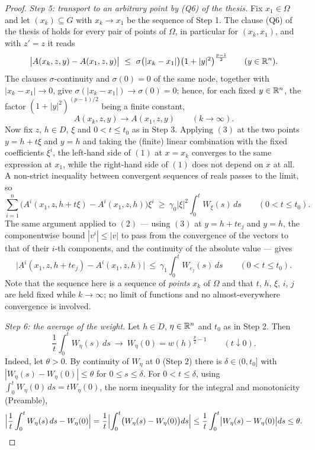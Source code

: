\begin{proof}
\emph{Step 5: transport to an arbitrary point by (Q6) of the thesis.}  Fix
$x_1\in\Omega$ and let $(x_k)\subseteq G$ with $x_k\to x_1$ be the sequence of
Step 1.  The clause (Q6) of the thesis of  holds for
every pair of points of $\Omega$, in particular for $(x_k,x_1)$, and with
$z'=z$ it reads
\[
\bigl|A(x_k,z,y)-A(x_1,z,y)\bigr|
\ \le\ \sigma\bigl(|x_k-x_1|\bigr)\bigl(1+|y|^2\bigr)^{\frac{p-1}2}
\qquad(y\in\mathbb{R}^n).
\]
The clauses $\sigma$-continuity and $\sigma(0)=0$ of the same node, together
with $|x_k-x_1|\to0$, give $\sigma(|x_k-x_1|)\to\sigma(0)=0$; hence, for each
fixed $y\in\mathbb{R}^n$, the factor $(1+|y|^2)^{(p-1)/2}$ being a finite constant,
\[
A(x_k,z,y)\longrightarrow A(x_1,z,y)\qquad(k\to\infty).
\tag{3}
\]
Now fix $z$, $h\in D$, $\xi$ and $0<t\le t_0$ as in Step 3.  Applying $(3)$ at
the two points $y=h+t\xi$ and $y=h$ and taking the (finite) linear combination
with the fixed coefficients $\xi^i$, the left-hand side of $(1)$ at $x=x_k$
converges to the same expression at $x_1$, while the right-hand side of $(1)$
does not depend on $x$ at all.  A non-strict inequality between convergent
sequences of reals passes to the limit, so
\[
\sum_{i=1}^n\bigl(A^i(x_1,z,h+t\xi)-A^i(x_1,z,h)\bigr)\xi^i
\ \ge\ \gamma_0|\xi|^2\int_0^tW_\xi(s)\,ds
\qquad(0<t\le t_0).
\tag{1$'$}
\]
The same argument applied to $(2)$ --- using $(3)$ at $y=h+te_j$ and $y=h$,
the componentwise bound $|v^i|\le|v|$ to pass from the convergence of the
vectors to that of their $i$-th components, and the continuity of the absolute
value --- gives
\[
\bigl|A^i(x_1,z,h+te_j)-A^i(x_1,z,h)\bigr|
\ \le\ \gamma_1\int_0^tW_{e_j}(s)\,ds
\qquad(0<t\le t_0).
\tag{2$'$}
\]
Note that the sequence here is a sequence of \emph{points} $x_k$ of $\Omega$ and
that $t$, $h$, $\xi$, $i$, $j$ are held fixed while $k\to\infty$; no limit of
functions and no almost-everywhere convergence is involved.

\emph{Step 6: the average of the weight.}  Let $h\in D$, $\eta\in\mathbb{R}^n$ and
$t_0$ as in Step 2.  Then
\[
\frac1t\int_0^tW_\eta(s)\,ds\ \longrightarrow\ W_\eta(0)=w(h)^{\frac p2-1}
\qquad(t\downarrow0).
\tag{4}
\]
Indeed, let $\theta>0$.  By continuity of $W_\eta$ at $0$ (Step 2) there is
$\delta\in(0,t_0]$ with $|W_\eta(s)-W_\eta(0)|\le\theta$ for $0\le s\le\delta$.
For $0<t\le\delta$, using $\int_0^tW_\eta(0)\,ds=tW_\eta(0)$, the norm
inequality for the integral and monotonicity (Preamble),
\[
\Bigl|\frac1t\int_0^tW_\eta(s)\,ds-W_\eta(0)\Bigr|
=\frac1t\Bigl|\int_0^t\bigl(W_\eta(s)-W_\eta(0)\bigr)ds\Bigr|
\le\frac1t\int_0^t\bigl|W_\eta(s)-W_\eta(0)\bigr|ds\le\theta .
\]


\end{proof}
